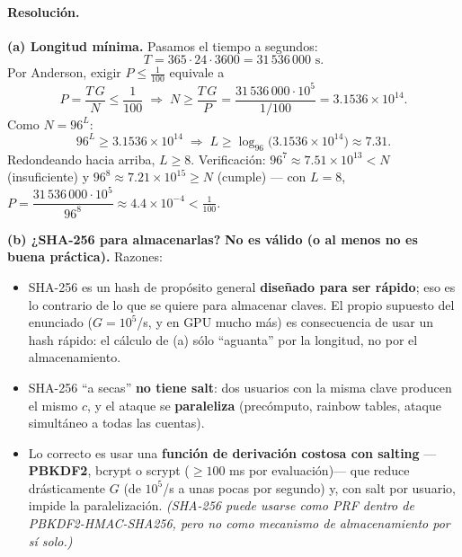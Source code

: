\paragraph{Resolución.}
\textbf{(a) Longitud mínima.} Pasamos el tiempo a segundos:
\begin{equation*}
  T = 365 \cdot 24 \cdot 3600 = 31\,536\,000 \text{ s}.
\end{equation*}
Por Anderson, exigir $P \le \tfrac{1}{100}$ equivale a
\begin{equation*}
  P = \frac{T\,G}{N} \le \frac{1}{100}
  \;\Longrightarrow\;
  N \ge \frac{T\,G}{P} = \frac{31\,536\,000 \cdot 10^{5}}{1/100}
       = 3.1536\times10^{14}.
\end{equation*}
Como $N = 96^{L}$:
\begin{equation*}
  96^{L} \ge 3.1536\times10^{14}
  \;\Longrightarrow\;
  L \ge \log_{96}\!\bigl(3.1536\times10^{14}\bigr) \approx 7.31.
\end{equation*}
Redondeando hacia arriba, $\boxed{L \ge 8}$. Verificación:
$96^{7} \approx 7.51\times10^{13} < N$ (insuficiente) y
$96^{8} \approx 7.21\times10^{15} \ge N$ (cumple) — con $L=8$,
$P = \dfrac{31\,536\,000\cdot 10^{5}}{96^{8}} \approx 4.4\times10^{-4} < \tfrac{1}{100}$.

\medskip
\textbf{(b) ¿SHA-256 para almacenarlas?} \textbf{No es válido (o al menos no es buena
práctica).} Razones:
\begin{itemize}
  \item SHA-256 es un hash de propósito general \textbf{diseñado para ser rápido}; eso es lo
        contrario de lo que se quiere para almacenar claves. El propio supuesto del enunciado
        ($G=10^5$/s, y en GPU mucho más) es consecuencia de usar un hash rápido: el cálculo de
        (a) sólo ``aguanta'' por la longitud, no por el almacenamiento.
  \item SHA-256 ``a secas'' \textbf{no tiene salt}: dos usuarios con la misma clave producen
        el mismo $c$, y el ataque se \textbf{paraleliza} (precómputo, rainbow tables, ataque
        simultáneo a todas las cuentas).
  \item Lo correcto es usar una \textbf{función de derivación costosa con salting} —
        \textbf{PBKDF2}, bcrypt o scrypt ($\ge 100$ ms por evaluación)— que reduce
        drásticamente $G$ (de $10^5$/s a unas pocas por segundo) y, con salt por usuario,
        impide la paralelización. \emph{(SHA-256 puede usarse como PRF \emph{dentro} de
        PBKDF2-HMAC-SHA256, pero no como mecanismo de almacenamiento por sí solo.)}
\end{itemize}
